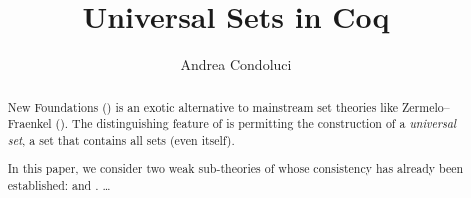 \documentclass[sigplan,10pt,anonymous,review]{acmart}\settopmatter{printfolios=true,printccs=false,printacmref=false}
\begin{document}
\title{Universal Sets in Coq}

\author{Andrea Condoluci}


\begin{abstract}
  New Foundations (\NF) is an exotic alternative to mainstream set theories like Zermelo–Fraenkel (\ZF). The distinguishing feature of \NF{} is permitting the construction of a \emph{universal set}, \ie{} a set that contains all sets (even itself). 
  
  In this paper, we consider two weak sub-theories of \NF{} whose consistency has already been established: \NFTWO{} and \NFO{}.
  \dots
\end{abstract}

\end{document}

